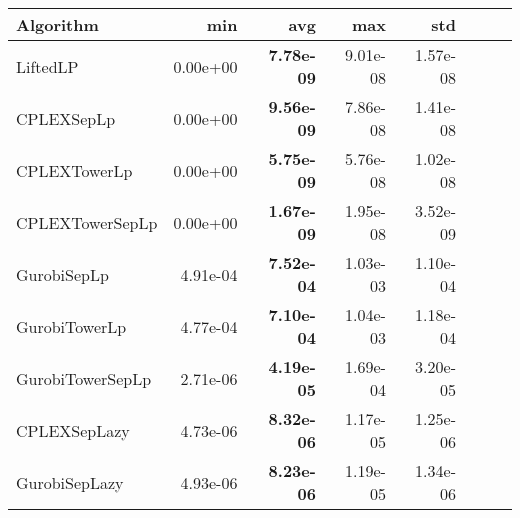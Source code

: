 \begin{tabular}{lrrrrrrr}
Algorithm & min & avg & max & std
\\
\hline
LiftedLP&0.00e+00& \bf7.78e-09& 9.01e-08& 1.57e-08\\
CPLEXSepLp&0.00e+00& \bf9.56e-09& 7.86e-08& 1.41e-08\\
CPLEXTowerLp&0.00e+00& \bf5.75e-09& 5.76e-08& 1.02e-08\\
CPLEXTowerSepLp&0.00e+00& \bf1.67e-09& 1.95e-08& 3.52e-09\\
GurobiSepLp&4.91e-04& \bf7.52e-04& 1.03e-03& 1.10e-04\\
GurobiTowerLp&4.77e-04& \bf7.10e-04& 1.04e-03& 1.18e-04\\
GurobiTowerSepLp&2.71e-06& \bf4.19e-05& 1.69e-04& 3.20e-05\\
CPLEXSepLazy&4.73e-06& \bf8.32e-06& 1.17e-05& 1.25e-06\\
GurobiSepLazy&4.93e-06& \bf8.23e-06& 1.19e-05& 1.34e-06
\end{tabular}
